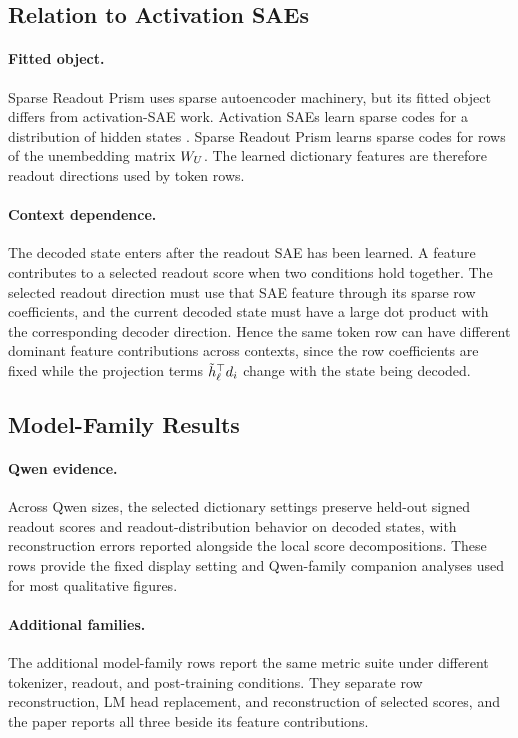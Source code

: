\subsection{Relation to Activation SAEs}
\label{app:extended-discussion-activation-sae}

\paragraph{Fitted object.}
Sparse Readout Prism uses sparse autoencoder machinery, but its fitted object
differs from activation-SAE work. Activation SAEs learn sparse codes for a
distribution of hidden states
\citep{bricken2023monosemanticity,cunningham2023sparse,gao2024scaling}. Sparse
Readout Prism learns sparse codes for rows of the unembedding matrix \(W_U\).
The learned dictionary features are therefore readout directions used by token
rows.

\paragraph{Context dependence.}
The decoded state enters after the readout SAE has been learned. A feature
contributes to a selected readout score when two conditions hold together. The selected
readout direction must use that SAE
feature through its sparse row coefficients, and the current decoded state must have a
large dot product with the corresponding decoder direction. Hence the same
token row can have different dominant feature contributions across contexts,
since the row coefficients are fixed while the projection terms
\(\tilde h_\ell^\top d_i\) change with the state being decoded.

\subsection{Model-Family Results}
\label{app:extended-discussion-cross-family}

\paragraph{Qwen evidence.}
Across Qwen sizes, the selected dictionary settings preserve held-out signed
readout scores and readout-distribution behavior on decoded states, with
reconstruction errors reported alongside the local score decompositions. These rows provide
the fixed display setting and Qwen-family companion analyses used for most
qualitative figures.

\paragraph{Additional families.}
The additional model-family rows report the same metric suite under
different tokenizer, readout, and post-training conditions. They separate row
reconstruction, LM head replacement, and reconstruction of selected scores, and the
paper reports all three beside its feature contributions.

